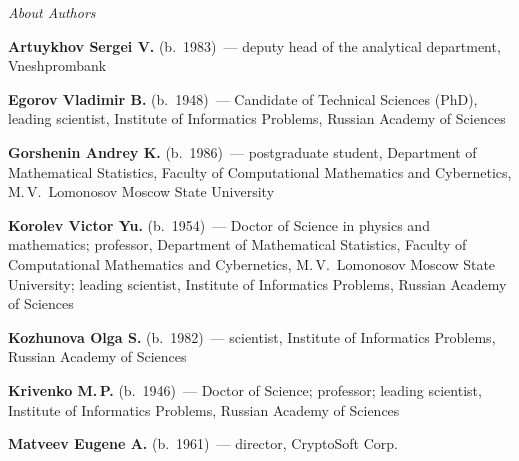 
\vspace*{-48pt}
\begin{center}\LARGE
\textit{About Authors}
\end{center}
\thispagestyle{empty}

\vspace*{36pt} %


\begin{multicols}{2}

\noindent %
\textbf{Artuykhov  Sergei V.} (b.\ 1983)~--- deputy head of the analytical
department, Vneshprombank

\vspace*{8pt}


\noindent %
\textbf{Egorov Vladimir B.} (b.\ 1948)~--- Candidate of Technical Sciences (PhD),
leading scientist, 
Institute of Informatics Problems, Russian Academy of Sciences

\vspace*{8pt}

\noindent %
\textbf{Gorshenin Andrey K.} (b.\ 1986)~--- postgraduate student,
Department of Mathematical
Statistics, Faculty of Computational Mathematics and Cybernetics, 
M.\,V.~Lomonosov Moscow State University


\vspace*{8pt}

\noindent %
\textbf{Korolev Victor Yu.} (b.\ 1954)~--- Doctor of Science in physics and 
mathematics; professor, Department of Mathematical Statistics, Faculty of Computational 
Mathematics and Cybernetics, M.\,V.~Lomonosov Moscow State University; 
leading scientist, Institute of 
Informatics Problems, Russian Academy of Sciences
{

}
\vspace*{8pt}

\noindent %
\textbf{Kozhunova Olga S.} (b.\ 1982)~--- scientist,
Institute of Informatics Problems, Russian Academy of Sciences
\columnbreak



\noindent %
\textbf{Krivenko M.\,P.} (b.\ 1946)~--- Doctor of Science; professor;
leading scientist, Institute of 
Informatics Problems, Russian Academy of Sciences

%

\vspace*{6pt}

\noindent %
\textbf{Matveev Eugene A.} (b.\ 1961)~---  director, CryptoSoft Corp.



\end{multicols}
